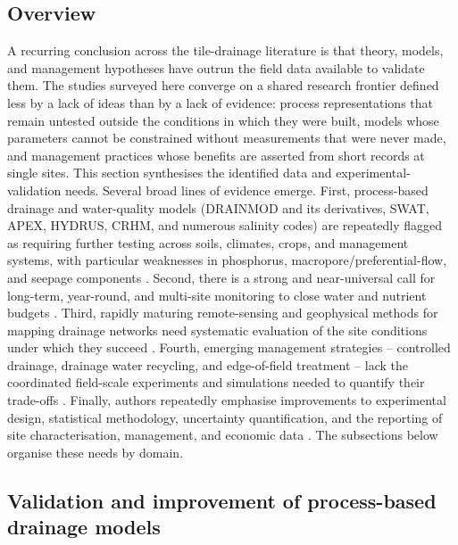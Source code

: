 \subsection{Overview}

A recurring conclusion across the tile-drainage literature is that theory,
models, and management hypotheses have outrun the field data available to
validate them. The studies surveyed here converge on a shared research
frontier defined less by a lack of ideas than by a lack of evidence: process
representations that remain untested outside the conditions in which they were
built, models whose parameters cannot be constrained without measurements that
were never made, and management practices whose benefits are asserted from
short records at single sites. This section synthesises the identified data and
experimental-validation needs. Several broad lines of evidence emerge. First,
process-based drainage and water-quality models (DRAINMOD and its derivatives,
SWAT, APEX, HYDRUS, CRHM, and numerous salinity codes) are repeatedly flagged as
requiring further testing across soils, climates, crops, and management systems,
with particular weaknesses in phosphorus, macropore/preferential-flow, and
seepage components \parencite{Youssef2006,Askar2021b,Askar2025,Radcliffe2015}.
Second, there is a strong and near-universal call for long-term, year-round, and
multi-site monitoring to close water and nutrient budgets
\parencite{Kladivko2001,Sharpley2019,Frankenberger2024}. Third, rapidly maturing
remote-sensing and geophysical methods for mapping drainage networks need
systematic evaluation of the site conditions under which they succeed
\parencite{Carlsen2024,Wienken2024}. Fourth, emerging management
strategies -- controlled drainage, drainage water recycling, and edge-of-field
treatment -- lack the coordinated field-scale experiments and simulations needed
to quantify their trade-offs \parencite{Hay2021,Youssef2018,Mendes2020}. Finally,
authors repeatedly emphasise improvements to experimental design, statistical
methodology, uncertainty quantification, and the reporting of site
characterisation, management, and economic data
\parencite{Pagliari2021,Singh2022b,Gates2002}. The subsections below organise
these needs by domain.

\subsection{Validation and improvement of process-based drainage models}


